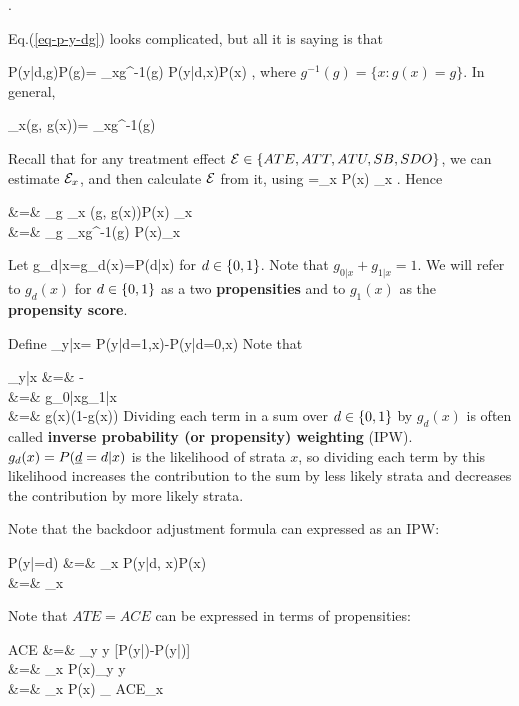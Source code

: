 \beq
{}
\;.
\label{eq-p-y-dg}
\eeq

Eq.(\ref{eq-p-y-dg}) 
looks complicated, but all
it is saying is that

\beq
P(y|d,g)P(g)=
\sum_{x\in g^{-1}(g)}
 P(y|d,x)P(x)
\;,
\eeq
where $g^{-1}(g)=
\{x: g(x)=g\}$.
In general,

\beq
\sum_x\delta(g, g(x))=
\sum_{x\in g^{-1}(g)}
\eeq



Recall that for any treatment
effect ${\cal E}
\in \{ATE, ATT,ATU, SB, SDO\}$, 
we can estimate ${\cal E}_x$,
and then calculate ${\cal E}$ from it, using
\beq
\cale=\sum_x P(x) \cale_x
\;.
\eeq
Hence

\beqa
\cale &=& \sum_g 
\sum_x \delta(g, g(x))P(x)
\cale_{x}
\\
&=&
\sum_g
\sum_{x\in g^{-1}(g)}
P(x)\cale_{x}
\eeqa


Let
\beq
g_{d|x}=g_d(x)=P(d|x)
\eeq
 for $d\in\{0,1\}$.
Note that $g_{0|x}+g_{1|x}=1$.
We will
refer to $g_d(x)$ 
for $d\in \{0,1\}$
as a two {\bf propensities}
and to $g_1(x)$ as the
{\bf propensity score}.

Define
\beq
\delta_{y|x}=
P(y|d=1,x)-P(y|d=0,x)
\eeq
Note that

\beqa
\delta_{y|x}
&=&
-
\\
&=&
{
g_{0|x}g_{1|x}
}
\\
&=&
{
g(x)(1-g(x))
}
\eeqa
Dividing
each term
in a sum over $d\in \{0,1\}$
by $g_ d(x)$ 
is often called
 {\bf inverse probability (or propensity)
weighting} (IPW).
$g_ d(x)=P({\underline{d}}= d|x)$ is the
likelihood of strata $x$,
so dividing each term by
this likelihood increases the
contribution to the sum
by less likely strata
and decreases the contribution by 
more likely strata.




Note that the 
backdoor adjustment formula
can  expressed 
as an IPW:



\beqa
P(y|\cald\rvd=d)
&=&
\sum_x P(y|d, x)P(x)
\\
&=&
\sum_x 
\eeqa

Note that $ATE=ACE$ can be expressed
in terms of propensities:



\beqa
ACE
&=&
\sum_y y [P(y|\cald{})-P(y|\cald{})]
\\
&=&
\sum_x P(x)\sum_y y
\left[
P(y|d=1,x)
-
P(y|d=0,x)
\right]
\\&=&
\sum_x P(x)
_
{ACE_x}
\label{eq-ace-propensity}
\eeqa



